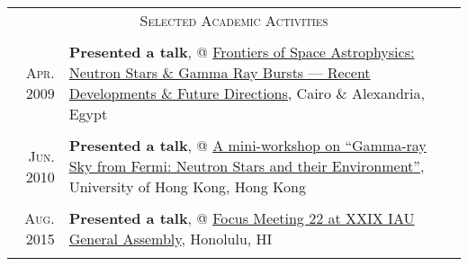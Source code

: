 \documentclass[letterpaper,10pt]{article}
\begin{document}
\begin{longtable}{r|p{5.5in}}

    \multicolumn{2}{c}{\textsc{Selected Academic Activities}}  \\
    \multicolumn{2}{c}{} \\

    \textsc{Apr. 2009}   &   \textbf{Presented a talk}, @ \href{http://www.ns-grb.com/index0.html}{Frontiers of Space Astrophysics: Neutron Stars \& Gamma Ray Bursts --- Recent Developments \& Future Directions}, Cairo \& Alexandria, Egypt     \\
    \multicolumn{2}{c}{} \\

    \textsc{Jun. 2010}   &   \textbf{Presented a talk}, @ \href{http://www.physics.hku.hk/~astro/2010Astro/Index.htm}{A mini-workshop on ``Gamma-ray Sky from Fermi: Neutron Stars and their Environment''}, University of Hong Kong, Hong Kong   \\
    \multicolumn{2}{c}{} \\



    \textsc{Aug. 2015}   &   \textbf{Presented a talk}, @ \href{http://hffiau.epfl.ch/page-116896.html}{Focus Meeting 22 at XXIX IAU
General Assembly}, Honolulu, HI     \\
    \multicolumn{2}{c}{} \\


\end{longtable}
\end{document}
